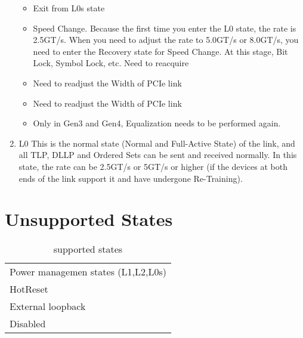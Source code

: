 \begin{enumerate}
\begin{itemize}
    \item  Exit from L0s state
    \item Speed Change. Because the first time you enter the L0 state, the rate is 2.5GT/s. When you need to adjust the rate to 5.0GT/s or 8.0GT/s, you need to enter the Recovery state for Speed Change. At this stage, Bit Lock, Symbol Lock, etc. Need to reacquire
    \item Need to readjust the Width of PCIe link
    \item Need to readjust the Width of PCIe link
    \item Only in Gen3 and Gen4, Equalization needs to be performed again.
\end{itemize}
    \item L0 \newline 
    This is the normal state (Normal and Full-Active State) of the link, and all TLP, DLLP and Ordered Sets can be sent and received normally. In this state, the rate can be 2.5GT/s or 5GT/s or higher (if the devices at both ends of the link support it and have undergone Re-Training).
    

\end{enumerate}



\section{Unsupported States}
\begin{table}[H]
    \caption{supported states}
    \centering
  \begin{tabular}{ |m{50mm}|}
\hline
\rowcolor{Gray}
\multicolumn{1}{|c|}{\textbf{
Supported States
} } \\
\hline

Power managemen states (L1,L2,L0s) \\ \hline 
HotReset \\ \hline
External loopback\\ \hline
Disabled\\ \hline

\end{tabular}

\end{table}


